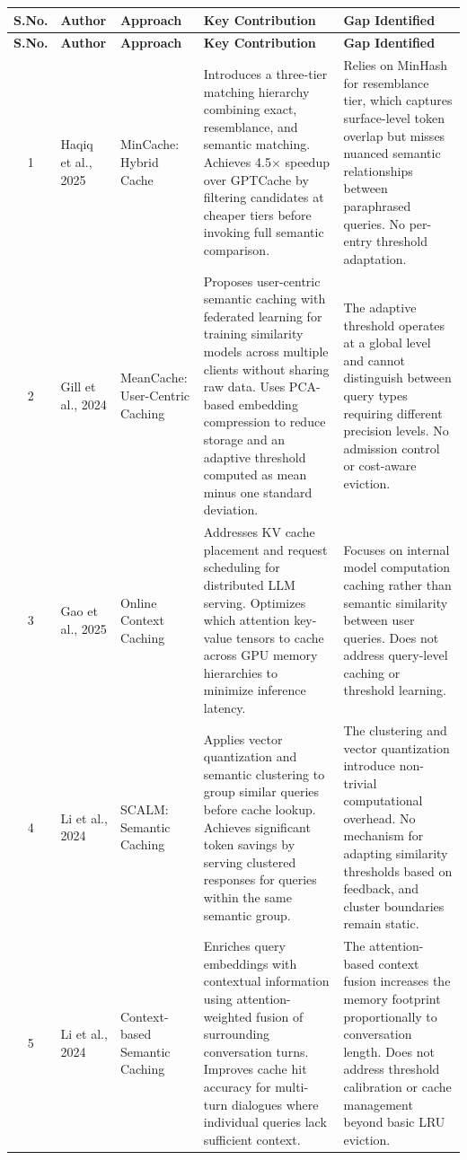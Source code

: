 \documentclass[12pt,a4paper]{report}
\begin{document}
\begin{longtable}{|c|p{2.5cm}|p{2.5cm}|p{4cm}|p{4cm}|}
\hline
\textbf{S.No.} & \textbf{Author} & \textbf{Approach} & \textbf{Key Contribution} & \textbf{Gap Identified} \\
\hline
\endfirsthead
\hline
\textbf{S.No.} & \textbf{Author} & \textbf{Approach} & \textbf{Key Contribution} & \textbf{Gap Identified} \\
\hline
\endhead
1 & Haqiq et al., 2025 & MinCache: Hybrid Cache & Introduces a three-tier matching hierarchy combining exact, resemblance, and semantic matching. Achieves 4.5$\times$ speedup over GPTCache by filtering candidates at cheaper tiers before invoking full semantic comparison. & Relies on MinHash for resemblance tier, which captures surface-level token overlap but misses nuanced semantic relationships between paraphrased queries. No per-entry threshold adaptation. \\
\hline
2 & Gill et al., 2024 & MeanCache: User-Centric Caching & Proposes user-centric semantic caching with federated learning for training similarity models across multiple clients without sharing raw data. Uses PCA-based embedding compression to reduce storage and an adaptive threshold computed as mean minus one standard deviation. & The adaptive threshold operates at a global level and cannot distinguish between query types requiring different precision levels. No admission control or cost-aware eviction. \\
\hline
3 & Gao et al., 2025 & Online Context Caching & Addresses KV cache placement and request scheduling for distributed LLM serving. Optimizes which attention key-value tensors to cache across GPU memory hierarchies to minimize inference latency. & Focuses on internal model computation caching rather than semantic similarity between user queries. Does not address query-level caching or threshold learning. \\
\hline
4 & Li et al., 2024 & SCALM: Semantic Caching & Applies vector quantization and semantic clustering to group similar queries before cache lookup. Achieves significant token savings by serving clustered responses for queries within the same semantic group. & The clustering and vector quantization introduce non-trivial computational overhead. No mechanism for adapting similarity thresholds based on feedback, and cluster boundaries remain static. \\
\hline
5 & Li et al., 2024 & Context-based Semantic Caching & Enriches query embeddings with contextual information using attention-weighted fusion of surrounding conversation turns. Improves cache hit accuracy for multi-turn dialogues where individual queries lack sufficient context. & The attention-based context fusion increases the memory footprint proportionally to conversation length. Does not address threshold calibration or cache management beyond basic LRU eviction. \\

\end{longtable}
\end{document}
